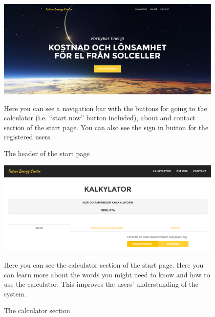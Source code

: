 \documentclass[]{article}
\begin{document}
\begin{figure}[H]
	\includegraphics[width=1.0\linewidth]{pic2}
	\caption{The header of the start page}
	\medskip
	\small
	Here you can see a navigation bar with the buttons for going to the calculator (i.e. “start now” button included), about and contact section of the start page. You can also see the sign in button for the registered users.
	\label{fig:pic2}
\end{figure}
\begin{figure}[H]
	\includegraphics[width=1.0\linewidth]{pic3}
	\caption{The calculator section}
	\medskip
	\small
	Here you can see the calculator section of the start page. Here you can learn more about the words you might need to know and how to use the calculator. This improves the users' understanding of the system.
	\label{fig:pic3}
\end{figure}
\end{document}
